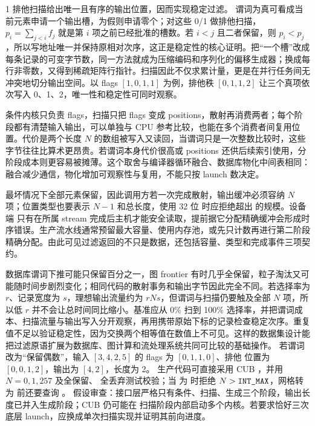 \begin{solutionexercise}{1}
\conclusionheading 排他扫描给出唯一且有序的输出位置，因而实现稳定过滤。
\discussionheading
{}谓词为真可看成当前元素申请一个输出槽，为假则申请零个；对这些 0/1 做排他扫描，$p_i=\sum_{j<i}f_j$ 就是第 $i$ 项之前已经批准的槽数。若 $i<j$ 且二者保留，则 $p_i<p_j$，所以写地址唯一并保持原相对次序，这正是稳定性的核心证明。把“一个槽”改成每条记录的可变字节数，同一方法就成为压缩编码和序列化的偏移生成器；换成每行非零数，又得到稀疏矩阵行指针。扫描因此不仅求累计量，更是在并行任务间无冲突地切分输出空间。以 flags $[1,0,1,1]$ 为例，排他秩 $[0,1,1,2]$ 让三个真项依次写入 0、1、2，唯一性和稳定性可同时观察。

条件内核只负责 flags，扫描只把 flags 变成 positions，散射再消费两者；每个阶段都有清楚输入输出，可以单独与 CPU 参考比较，也能在多个消费者间复用位置。代价是两个长度 $N$ 的数组被写入又读回，当谓词只是一次整数比较时，这些字节往往比算术更昂贵。若谓词本身代价很高或 positions 还供后续索引使用，分阶段成本则更容易被摊薄。这个取舍与编译器循环融合、数据库物化中间表相同：融合减少通信，物化增加可观察性与复用，不能只按 launch 数决定。

最坏情况下全部元素保留，因此调用方若一次完成散射，输出缓冲必须容纳 $N$ 项；位置类型也要表示 $N-1$ 和总长度，使用 32 位  时应拒绝超出  的规模。设备端  只有在所属 stream 完成后主机才能安全读取，提前据它分配精确缓冲会形成时序错误。生产流水线通常预留最大容量、使用内存池，或先只计数再进行第二阶段精确分配。由此可见过滤返回的不只是数据，还包括容量、类型和完成事件三项契约。

数据库谓词下推可能只保留百分之一，图 frontier 有时几乎全保留，粒子淘汰又可能随时间步剧烈变化；相同代码的散射事务和输出字节因此完全不同。若选择率为 $r$、记录宽度为 $s$，理想输出流量约为 $rNs$，但谓词与扫描仍要触及全部 $N$ 项，所以低 $r$ 并不会让总时间同比缩小。基准应从 0\% 扫到 100\% 选择率，并把谓词成本、扫描流量与输出写入分开观察，再用携带原始下标的记录检查稳定次序。重复值不足以验证稳定性，因为交换两个相等值在数值上不可见。这样的数据集设计能把过滤原语扩展为数据库、图计算和流处理系统共同可比较的基础操作。
\variantheading 若谓词改为“保留偶数”，输入 $[3,4,2,5]$ 的 flags 为 $[0,1,1,0]$、排他
位置为 $[0,0,1,2]$，输出为 $[4,2]$，长度为 2。
\practiceheading 生产代码可直接采用 CUB ，并用 $N=0,1,257$ 及全保留、
全丢弃测试校验；当  为  时拒绝 $N>\code{INT_MAX}$，网格转为
 前还要查询 。
假设审查：接口层严格只有条件、扫描、生成三个阶段，输出长度已并入生成阶段；CUB 仍可能在
扫描阶段内部启动多个内核。若要求恰好三次底层 launch，应换成单次扫描实现并证明其前向进度。
\end{solutionexercise}

